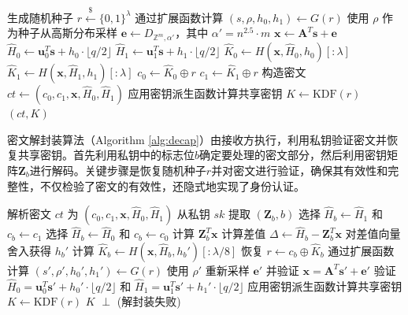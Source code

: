 \begin{algorithm}
\caption{OW-ChCCA-KEM封装算法}
\label{alg:encap}
\begin{algorithmic}[1]
    \State 生成随机种子 $r \stackrel{\$}{\leftarrow} \{0,1\}^{\lambda}$
    \State 通过扩展函数计算 $(s, \rho, h_0, h_1) \gets G(r)$
    \State 使用 $\rho$ 作为种子从高斯分布采样 $\mathbf{e} \leftarrow D_{\mathbb{Z}^m, \alpha'}$，其中 $\alpha' = n^{2.5} \cdot m$
    \State $\mathbf{x} \gets \mathbf{A}^T\mathbf{s} + \mathbf{e}$
    \State $\hat{H}_0 \gets \mathbf{u}_0^T\mathbf{s} + h_0 \cdot \lfloor q/2 \rfloor$
    \State $\hat{H}_1 \gets \mathbf{u}_1^T\mathbf{s} + h_1 \cdot \lfloor q/2 \rfloor$
    \State $\hat{K}_0 \gets H(\mathbf{x}, \hat{H}_0, h_0)[:{\lambda}]$
    \State $\hat{K}_1 \gets H(\mathbf{x}, \hat{H}_1, h_1)[:{\lambda}]$
    \State $c_0 \gets \hat{K}_0 \oplus r$
    \State $c_1 \gets \hat{K}_1 \oplus r$
    \State 构造密文 $ct \gets (c_0, c_1, \mathbf{x}, \hat{H}_0, \hat{H}_1)$
    \State 应用密钥派生函数计算共享密钥 $K \gets \text{KDF}(r)$
    \State \Return $(ct, K)$
\EndProcedure
\end{algorithmic}
\end{algorithm}

密文解封装算法（Algorithm \ref{alg:decap}）由接收方执行，利用私钥验证密文并恢复共享密钥。首先利用私钥中的标志位$b$确定要处理的密文部分，然后利用密钥矩阵$\mathbf{Z}_b$进行解码。关键步骤是恢复随机种子$r$并对密文进行验证，确保其有效性和完整性，不仅检验了密文的有效性，还隐式地实现了身份认证。

\begin{algorithm}
\caption{OW-ChCCA-KEM解封装算法}
\label{alg:decap}
\begin{algorithmic}[1]
    \State 解析密文 $ct$ 为 $(c_0, c_1, \mathbf{x}, \hat{H}_0, \hat{H}_1)$
    \State 从私钥 $sk$ 提取 $(\mathbf{Z}_b, b)$
        \State 选择 $\hat{H}_b \gets \hat{H}_1$ 和 $c_b \gets c_1$
    \Else
        \State 选择 $\hat{H}_b \gets \hat{H}_0$ 和 $c_b \gets c_0$
    \EndIf
    \State 计算 $\mathbf{Z}_b^T\mathbf{x}$
    \State 计算差值 $\Delta \gets \hat{H}_b - \mathbf{Z}_b^T\mathbf{x}$
    \State 对差值向量舍入获得 $h_b'$
    \State 计算 $\hat{K}_b \gets H(\mathbf{x}, \hat{H}_b, h_b')[:{\lambda/8}]$
    \State 恢复 $r \gets c_b \oplus \hat{K}_b$
    \State 通过扩展函数计算 $(s', \rho', h_0', h_1') \gets G(r)$
    \State 使用 $\rho'$ 重新采样 $\mathbf{e}'$ 并验证 $\mathbf{x} = \mathbf{A}^T\mathbf{s}' + \mathbf{e}'$
    \State 验证 $\hat{H}_0 = \mathbf{u}_0^T\mathbf{s}' + h_0' \cdot \lfloor q/2 \rfloor$ 和 $\hat{H}_1 = \mathbf{u}_1^T\mathbf{s}' + h_1' \cdot \lfloor q/2 \rfloor$
        \State 应用密钥派生函数计算共享密钥 $K \gets \text{KDF}(r)$
        \State \Return $K$
    \Else
        \State \Return $\perp$ (解封装失败)
    \EndIf
\EndProcedure
\end{algorithmic}
\end{algorithm}